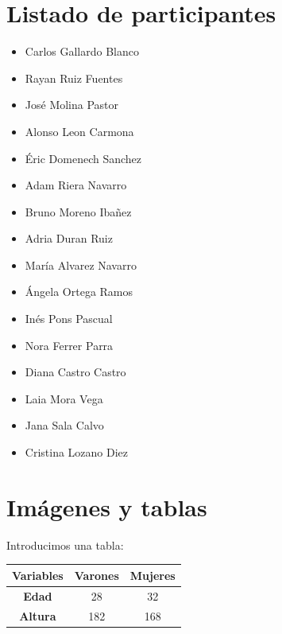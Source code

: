 \documentclass[a4paper,11pt]{article}
\begin{document}
\newpage

\section{Listado de participantes}

\begin{minipage}{0.5\linewidth}
	\begin{itemize}
		\item Carlos Gallardo Blanco
		\item Rayan Ruiz Fuentes
		\item José Molina Pastor
		\item Alonso Leon Carmona
		\item Éric Domenech Sanchez
		\item Adam Riera Navarro
		\item Bruno Moreno Ibañez
		\item Adria Duran Ruiz
	\end{itemize}
\end{minipage}
\begin{minipage}{0.5\linewidth}
	\begin{itemize}
		\item María Alvarez Navarro
		\item Ángela Ortega Ramos
		\item Inés Pons Pascual
		\item Nora Ferrer Parra
		\item Diana Castro Castro
		\item Laia Mora Vega
		\item Jana Sala Calvo
		\item Cristina Lozano Diez
	\end{itemize}
\end{minipage}

\section{Imágenes y tablas}

Introducimos una tabla:\\

	\begin{tabular}{|c|c|c|}
		\hline
		\rowcolor[HTML]{C0C0C0} 
		\textbf{Variables} & \textbf{Varones} & \textbf{Mujeres} \\ \hline
		\textbf{Edad}      & 28               & 32               \\ \hline
		\textbf{Altura}    & 182              & 168              \\ \hline
	\end{tabular}
\end{document}
